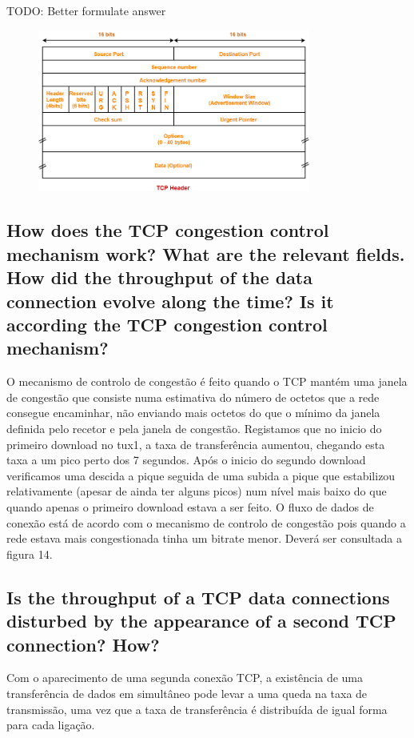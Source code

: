 \documentclass[11pt]{report}
\begin{document}
TODO: Better formulate answer

\begin{figure}[h!]
    \centering
    \includegraphics[width=0.8\textwidth]{images/TCP_Header_Format.png}
\end{figure}

\subsection{How does the TCP congestion control mechanism work? What are the
relevant fields. How did the throughput of the data connection evolve
along the time? Is it according the TCP congestion control mechanism?}

O mecanismo de controlo de congestão é feito quando o TCP mantém uma janela de congestão que consiste numa estimativa do número de octetos que a rede consegue encaminhar, não enviando mais octetos do que o mínimo da janela definida pelo recetor e pela janela de congestão.
Registamos que no inicio do primeiro download no tux1, a taxa de transferência aumentou, chegando esta taxa a um pico perto dos 7 segundos. Após o inicio do segundo download verificamos uma descida a pique seguida de uma subida a pique que estabilizou relativamente (apesar de ainda ter alguns picos) num nível mais baixo do que quando apenas o primeiro download estava a ser feito.
O fluxo de dados de conexão está de acordo com o mecanismo de controlo de congestão pois quando a rede estava mais congestionada tinha um bitrate menor. Deverá ser consultada a figura 14.


\subsection{Is the throughput of a TCP data connections disturbed by the appearance of a second TCP connection? How?}

Com o aparecimento de uma segunda conexão TCP, a existência de uma transferência de dados em simultâneo pode levar a uma queda na taxa de transmissão, uma vez que a taxa de transferência é distribuída de igual forma para cada ligação.
\end{document}
